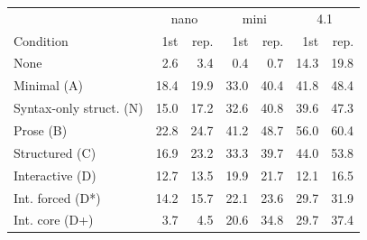 \begin{tabular}{lrrrrrr}
\toprule
& \multicolumn{2}{c}{nano} & \multicolumn{2}{c}{mini} & \multicolumn{2}{c}{4.1} \\
Condition & 1st & rep. & 1st & rep. & 1st & rep. \\
\midrule
None & 2.6 & 3.4 & 0.4 & 0.7 & 14.3 & 19.8 \\
Minimal (A) & 18.4 & 19.9 & 33.0 & 40.4 & 41.8 & 48.4 \\
Syntax-only struct. (N) & 15.0 & 17.2 & 32.6 & 40.8 & 39.6 & 47.3 \\
Prose (B) & 22.8 & 24.7 & 41.2 & 48.7 & 56.0 & 60.4 \\
Structured (C) & 16.9 & 23.2 & 33.3 & 39.7 & 44.0 & 53.8 \\
Interactive (D) & 12.7 & 13.5 & 19.9 & 21.7 & 12.1 & 16.5 \\
Int. forced (D*) & 14.2 & 15.7 & 22.1 & 23.6 & 29.7 & 31.9 \\
Int. core (D+) & 3.7 & 4.5 & 20.6 & 34.8 & 29.7 & 37.4 \\
\bottomrule
\end{tabular}